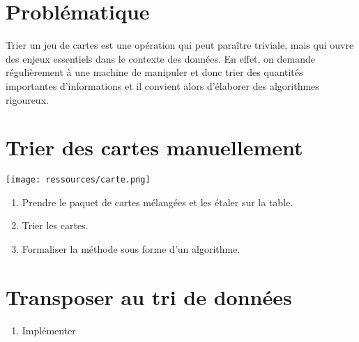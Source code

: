 \documentclass[a4paper,11pt]{article}
\begin{document}
\section{Problématique}
Trier un jeu de cartes est une opération qui peut paraître triviale, mais qui ouvre des enjeux essentiels dans le contexte des données. En effet, on demande régulièrement à une machine de manipuler et donc trier des quantités importantes d'informations et il convient alors d'élaborer des algorithmes rigoureux.
\begin{center}
\end{center}
\section{Trier des cartes manuellement}
\begin{center}
\centering
\texttt{[image: ressources/carte.png]}
\label{pique}
\end{center}
\begin{activite}
\begin{enumerate}
    \item Prendre le paquet de cartes mélangées et les étaler sur la table.
    \item Trier les cartes.
    \item Formaliser la méthode sous forme d'un algorithme.
\end{enumerate}
\end{activite}
\section{Transposer au tri de données}
\begin{activite}
\begin{enumerate}
    \item Implémenter 
\end{enumerate}
\end{activite}
\end{document}
